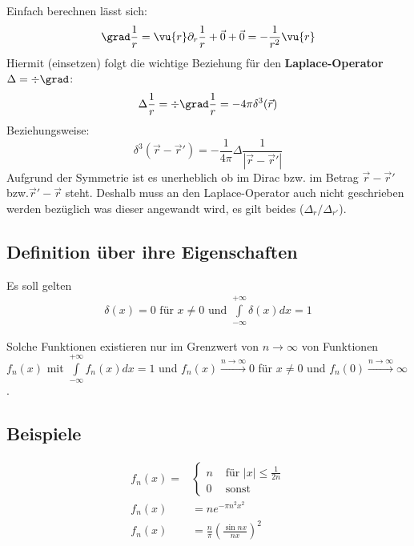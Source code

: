 	  Einfach berechnen lässt sich:
	  \begin{equation}
		  \begin{split}
			  \grad \frac{1}{r}= \vu{r}\partial_{r} \frac{1}{r}+ \vec{0}+ \vec{0}=-\frac{1}{r^{2}}
			  \vu{r}
		  \end{split}
	  \end{equation}
	  Hiermit (einsetzen) folgt die wichtige Beziehung für den \textbf{Laplace-Operator}
	  $\Delta = \div\grad$:
	  \begin{equation}
		  \begin{split}
			  \Delta \frac{1}{r}= \div\grad \frac{1}{r}= -4\pi\delta^{3}(\vec{r})
		  \end{split}
	  \end{equation}
	Beziehungsweise:
	\begin{equation}\label{diraclaplace}
		\delta^3(\vec{r}  - \vec{r}\prime ) = -\frac{1}{4\pi}\Delta \frac{1}{|\vec{r}  - \vec{r}\prime |}
	\end{equation}
	Aufgrund der Symmetrie ist es unerheblich ob im Dirac bzw. im Betrag $\vec{r}-\vec{r}\prime$ bzw.$\vec{r}\prime-\vec{r}$ steht. Deshalb muss an den Laplace-Operator auch nicht geschrieben werden bezüglich was dieser angewandt wird, es gilt beides ($\Delta_r/\Delta_{r\prime}$).
  \subsection{Definition über ihre Eigenschaften}
	  Es soll gelten
	  \begin{equation}
		  \begin{split}
			  \delta(x)=0 \text{ für }x\neq 0 \text{ und }\int\limits_{-\infty}^{+\infty}
			  \delta(x) dx = 1
		  \end{split}
	  \end{equation}

	  Solche Funktionen existieren nur im Grenzwert von $n\to\infty$ von Funktionen $f
			  _{n}(x)$ mit $\int\limits_{-\infty}^{+\infty}f_{n}(x) dx = 1$ und $f_{n}(x) \stackrel{n\to\infty}{\to}
		  0$ für $x\neq 0$ und $f_{n}(0) \stackrel{n\to\infty}{\to}\infty$.
  \subsection{Beispiele}
	  \begin{equation}
		  \begin{split}
			  f_{n}(x) =&
			  \begin{cases}
				  n & \text{ für }|x|\le\frac{1}{2n} \\
				  0 & \text{ sonst }
			  \end{cases}\\ f_{n}(x)&= n e^{-\pi n^2x^2}\\ f_{n}(x)&= \frac{n}{\pi}\left(
			  \frac{\sin nx}{nx}\right)^{2}
		  \end{split}
	  \end{equation}
